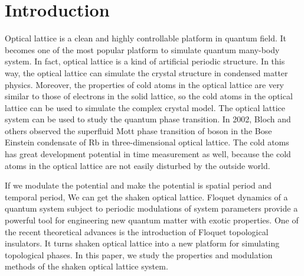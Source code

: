 \documentclass[
 reprint,
amsmath,amssymb,
aps,
pra,
floatfix,
]{revtex4-2}
\begin{document}

\section{\label{sec:level1}Introduction}

Optical lattice is a clean and highly controllable platform in quantum field.
It becomes one of the most popular platform to simulate quantum many-body system.\cite{jaksch1998cold, morsch2006dynamics, eckardt2009exploring}
In fact, optical lattice is a kind of artificial periodic structure.
In this way, the optical lattice can simulate the crystal structure in condensed matter physics. 
Moreover, the properties of cold atoms in the optical lattice are very similar to those of electrons in the solid lattice, 
so the cold atoms in the optical lattice can be used to simulate the complex crystal model.\cite{bloch2005ultracold, lewenstein2007ultracold, jordens2008mott}
The optical lattice system can be used to study the quantum phase transition.
In 2002, Bloch and others observed the superfluid Mott phase transition of boson in the Bose Einstein condensate of Rb in three-dimensional optical lattice.\cite{Greiner2002Quantum}
The cold atoms has great development potential in time measurement as well, because the cold atoms in the optical lattice are not easily disturbed by the outside world. \cite{bloom2014optical, takamoto2005optical}

If we modulate the potential and make the potential is spatial period and temporal period, We can get the shaken optical lattice.\cite{eckardt2005superfluid, ha2015roton, kelecs2017effective}
Floquet dynamics of a quantum system subject to periodic modulations of system parameters provide a powerful tool for engineering new quantum matter with exotic properties.\cite{zheng2014floquet, luo2018self}
One of the recent theoretical advances is the introduction of Floquet topological insulators. It turns shaken optical lattice into a new platform for simulating topological phases.
\cite{katan2013modulated, mei2014topological, grushin2014floquet, beri2011z}
In this paper, we study the properties and modulation methods of the shaken optical lattice system.
\end{document}
